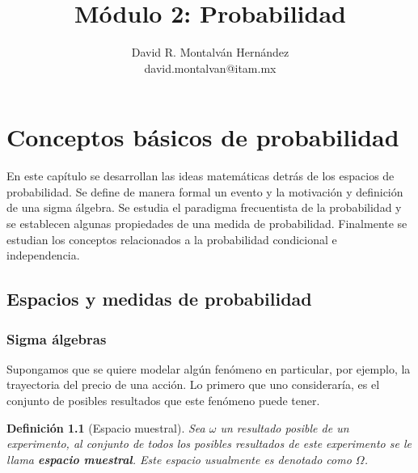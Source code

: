 \documentclass[11pt]{report}
\title{Módulo 2: Probabilidad}
\author{David R. Montalván Hernández \\ david.montalvan@itam.mx}
\date{}
\theoremstyle{break}
\newtheorem{definicion}{Definición}[chapter]
\theoremstyle{break}
\begin{document}
\sloppy %
\maketitle
\renewcommand{\contentsname}{Contenido}
\tableofcontents
\renewcommand{\listfigurename}{Lista de imágenes}
\renewcommand{\listtablename}{Lista de tablas}
\renewcommand\tablename{Tabla}
\renewcommand{\bibname}{Referencias}
\renewcommand{\figurename}{Figura}
\renewcommand{\chaptername}{Capítulo}

\chapter{Conceptos básicos de probabilidad}
\label{capitulo:conceptos basicos}
En este capítulo se desarrollan las ideas matemáticas detrás de los espacios de probabilidad. Se define de manera formal un evento y la motivación y definición de una sigma álgebra. Se estudia el paradigma frecuentista de la probabilidad y se establecen algunas propiedades de una medida de probabilidad. Finalmente se estudian los conceptos relacionados a la probabilidad condicional e independencia.

\section{Espacios y medidas de probabilidad}
\label{seccion:espacios y medidas de probabilidad}

\subsection{Sigma álgebras}
\label{seccion:sigma algebras}

Supongamos que se quiere modelar algún fenómeno en particular, por ejemplo, la trayectoria del precio de una acción. Lo primero que uno consideraría, es el conjunto de posibles resultados que este fenómeno puede tener.

\begin{definicion}[Espacio muestral]
\label{definicion: espacio muestral}
Sea $\omega$ un resultado posible de un experimento, al conjunto de todos los posibles resultados de este experimento se le llama \textbf{espacio muestral}. Este espacio usualmente es denotado como $\Omega$.
\end{definicion}
\end{document}
